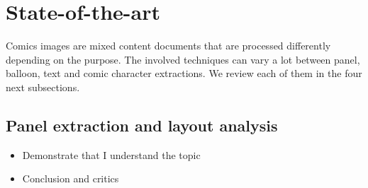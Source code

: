 \chapter{State-of-the-art} %
\label{chap:sota}
\graphicspath{{./chapters/3-state-of-the-art/figs/}}


Comics images are mixed content documents that are processed differently depending on the purpose.
The involved techniques can vary a lot between panel, balloon, text and comic character extractions.
We review each of them in the four next subsections.

\section{Panel extraction and layout analysis}
\label{sec:sota:layout_panel}

\begin{itemize}
	\item Demonstrate that I understand the topic
	\item Conclusion and critics
\end{itemize}

